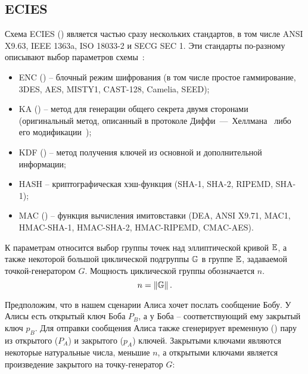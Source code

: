 \subsection{ECIES}

Схема ECIES () является частью сразу нескольких стандартов, в том числе ANSI X9.63, IEEE 1363a, ISO 18033-2 и SECG SEC 1. Эти стандарты по-разному описывают выбор параметров схемы~\cite{Martinez:Encinas:Avila:2010}:

\begin{itemize}
	\item ENC () -- блочный режим шифрования (в том числе простое гаммирование, 3DES, AES, MISTY1, CAST-128, Camelia, SEED);
	\item KA () -- метод для генерации общего секрета двумя сторонами (оригинальный метод, описанный в протоколе Диффи~---~Хеллмана~\cite{Diffie:Hellman:1976} либо его модификации~\cite{Miller:1986});
	\item KDF () -- метод получения ключей из основной и дополнительной информации;
	\item HASH -- криптографическая хэш-функция (SHA-1, SHA-2, RIPEMD, SHA-1);
	\item MAC () -- функция вычисления имитовставки (DEA, ANSI X9.71, MAC1, HMAC-SHA-1, HMAC-SHA-2, HMAC-RIPEMD, CMAC-AES).
\end{itemize}

К параметрам относится выбор группы точек над эллиптической кривой $\mathbb{E}$, а также некоторой большой циклической подгруппы $\mathbb{G}$ в группе $\mathbb{E}$, задаваемой точкой-генератором $G$. Мощность циклической группы обозначается $n$.
\[n = \left\| \mathbb{G} \right\|.\]

Предположим, что в нашем сценарии Алиса хочет послать сообщение Бобу. У Алисы есть открытый ключ Боба $P_B$, а у Боба -- соответствующий ему закрытый ключ $p_B$. Для отправки сообщения Алиса также сгенерирует временную () пару из открытого ($P_A$) и закрытого ($p_A$) ключей. Закрытыми ключами являются некоторые натуральные числа, меньшие $n$, а открытыми ключами является произведение закрытого на точку-генератор $G$:

